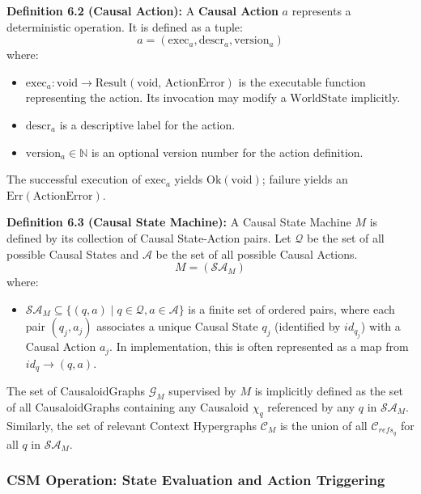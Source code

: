 \noindent\textbf{Definition 6.2 (Causal Action):} A \textbf{Causal Action} \(a\) represents a deterministic operation. It is defined as a tuple:
\[ a = (\text{exec}_a, \text{descr}_a, \text{version}_a) \]
where:
\begin{itemize}
    \item \( \text{exec}_a: \text{void} \to \text{Result}(\text{void, ActionError}) \) is the executable function representing the action. Its invocation may modify a \(\text{WorldState}\) implicitly.
    \item \( \text{descr}_a \) is a descriptive label for the action.
    \item \( \text{version}_a \in \mathbb{N} \) is an optional version number for the action definition.
\end{itemize}
The successful execution of \( \text{exec}_a \) yields \( \text{Ok}(\text{void}) \); failure yields an \( \text{Err}(\text{ActionError}) \).

\vspace{\baselineskip} %

\noindent\textbf{Definition 6.3 (Causal State Machine):} A Causal State Machine \( M \) is defined by its collection of Causal State-Action pairs. Let \(\mathcal{Q}\) be the set of all possible Causal States and \(\mathcal{A}\) be the set of all possible Causal Actions.
\[ M = (\mathcal{SA}_M) \]
where:
\begin{itemize}
    \item \( \mathcal{SA}_M \subseteq \{(q, a) \mid q \in \mathcal{Q}, a \in \mathcal{A}\} \) is a finite set of ordered pairs, where each pair \( (q_j, a_j) \) associates a unique Causal State \(q_j\) (identified by \(id_{q_j}\)) with a Causal Action \(a_j\). In implementation, this is often represented as a map from \(id_q \to (q, a)\).
\end{itemize}
The set of CausaloidGraphs \(\mathcal{G}_M\) supervised by \(M\) is implicitly defined as the set of all CausaloidGraphs containing any Causaloid \(\chi_q\) referenced by any \(q\) in \(\mathcal{SA}_M\). Similarly, the set of relevant Context Hypergraphs \(\mathcal{C}_M\) is the union of all \(\mathcal{C}_{refs_q}\) for all \(q\) in \(\mathcal{SA}_M\).

    \subsubsection[CSM Operation: State Evaluation and Action Triggering]{CSM Operation: State Evaluation and Action Triggering}
    \label{ssec:csm_operation_formal_merged}

